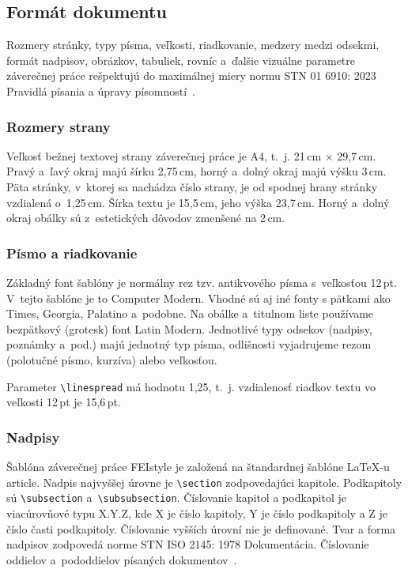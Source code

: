 \documentclass[../../../thesis.tex]{subfiles}
\begin{document}
\subsection{Formát dokumentu}
Rozmery stránky, typy písma, veľkosti, riadkovanie,
medzery medzi odsekmi, formát nadpisov, obrázkov, tabuliek,
rovníc a~ďalšie vizuálne parametre záverečnej práce
rešpektujú do maximálnej miery normu STN 01 6910: 2023
Pravidlá písania a úpravy písomností~\cite{stn016910}.

\subsubsection*{Rozmery strany}
Veľkosť bežnej textovej strany záverečnej práce je A4,
t.~j. 21\,cm $\times$ 29,7\,cm.
Pravý a~ľavý okraj majú šírku 2,75\,cm,
horný a~dolný okraj majú výšku 3\,cm.
Päta stránky, v~ktorej sa nachádza číslo strany,
je od spodnej hrany stránky vzdialená o~1,25\,cm.
Šírka textu je 15,5\,cm, jeho výška 23,7\,cm.
Horný a~dolný okraj obálky sú z~estetických
dôvodov zmenšené na 2\,cm.

\subsubsection*{Písmo a riadkovanie}
Základný font šablóny je normálny rez tzv. antikvového písma
s~veľkosťou 12\,pt.
V~tejto šablóne je to Computer Modern.
Vhodné sú aj iné fonty s pätkami ako Times, Georgia, Palatino a~podobne.
Na obálke a~titulnom liste používame bezpätkový (grotesk) font Latin Modern.
Jednotlivé typy odsekov (nadpisy, poznámky a~pod.)
majú jednotný typ písma,
odlišnosti vyjadrujeme rezom (polotučné písmo, kurzíva)
alebo veľkosťou.

Parameter \verb|\linespread| má hodnotu 1,25, t.~j.
vzdialenosť riadkov textu vo veľkosti 12\,pt je 15,6\,pt.

\subsubsection*{Nadpisy}
Šablóna záverečnej práce FEIstyle je založená na
štandardnej šablóne \LaTeX-u article.
Nadpis najvyššej úrovne je \verb|\section| zodpovedajúci kapitole.
Podkapitoly sú \verb|\subsection| a~\verb|\subsubsection|.
Číslovanie kapitol a podkapitol je viacúrovňové typu X.Y.Z, kde X je číslo kapitoly, Y je číslo podkapitoly a Z je číslo časti podkapitoly.
Číslovanie vyšších úrovní nie je definované.
Tvar a forma nadpisov zodpovedá norme STN ISO 2145: 1978 Dokumentácia.
Číslovanie oddielov a~pododdielov písaných dokumentov~\cite{iso2145}.
\end{document}
